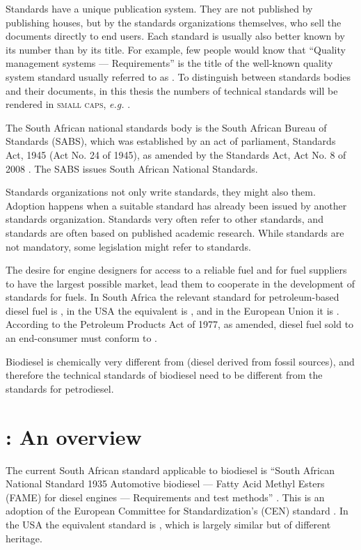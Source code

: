 Standards have a unique publication system. They are not published by publishing
houses, but by the standards organizations themselves, who sell the documents
directly to end users. Each standard is usually also better known by its number
than by its title. For example, few people would know that ``Quality management
systems — Requirements'' is the title of the well-known quality system standard
usually referred to as . To distinguish between standards bodies
and their documents, in this thesis the numbers of technical standards will be
rendered in \textsc{small caps}, \textit{e.g.} .

The South African national standards body is the South African Bureau of
Standards (SABS), which was established by an act of parliament,
 Standards Act, 1945 (Act No. 24 of 1945), as amended by the Standards Act, Act
 No. 8 of 2008 \autocite{Act8-2008}. The SABS issues South African National
 Standards.

Standards organizations not only write standards, they might also
 them. Adoption happens when a suitable standard has already been
issued by another standards organization. Standards very often refer to other
standards, and standards are often based on published academic research. While
standards are not mandatory, some legislation might refer to standards.

The desire for engine designers for access to a reliable fuel and for fuel
suppliers to have the largest possible market, lead them to cooperate in the
development of standards for fuels. In South Africa the relevant standard for
petroleum-based diesel fuel is , in the USA the equivalent is
, and in the European Union it is . According to the
Petroleum Products Act of 1977, as amended, diesel fuel sold to an end-consumer
must conform to .

Biodiesel is chemically very different from  (diesel
derived from fossil sources), and therefore the technical standards of biodiesel
need to be different from the standards for petrodiesel.

\section{\texorpdfstring{}{SANS 1935}: An overview}

The current South African standard applicable to biodiesel is ``South African
National Standard 1935 Automotive biodiesel — Fatty Acid Methyl Esters (FAME)
for diesel engines — Requirements and test methods'' \autocite{SANS1935}. This
is an adoption of the European Committee for Standardization's (CEN) standard
 \autocite{EN14214}. In the USA the equivalent standard is
, which is largely similar but of different heritage.

